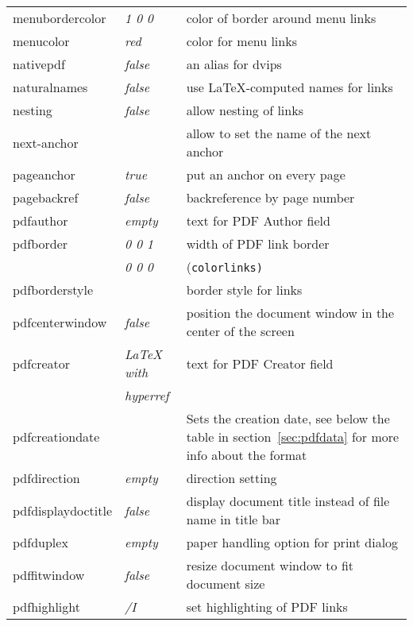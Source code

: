 \documentclass{article}
\begin{document}
\begin{longtable}{@{}>{\ttfamily}llp{7cm}@{}}
menubordercolor    & \textit{1 0 0}         & color of border around menu links \\
menucolor          & \textit{red}           & color for menu links \\
nativepdf          & \textit{false}         & an alias for \textsf{dvips} \\
naturalnames       & \textit{false}         & use \LaTeX-computed names for links \\
nesting            & \textit{false}         & allow nesting of links \\
next-anchor        &                        & allow to set the name of the next anchor\\
pageanchor         & \textit{true}          & put an anchor on every page \\
pagebackref        & \textit{false}         & backreference by page number \\
pdfauthor          & \textit{empty}         & text for PDF Author field \\
pdfborder          & \textit{0 0 1}         & width of PDF link border \\
                   & \textit{0 0 0}         & (\texttt{colorlinks)} \\
pdfborderstyle     &                        & border style for links \\
pdfcenterwindow    & \textit{false}         & position the document window in the center of the screen \\
pdfcreator         & \textit{LaTeX with}    & text for PDF Creator field \\
                   & \textit{hyperref}      & \\
pdfcreationdate    &                        & Sets the creation date, see below the table in section~\ref{sec:pdfdata} for more info about the format\\                    
pdfdirection       & \textit{empty}         & direction setting \\
pdfdisplaydoctitle & \textit{false}         & display document title instead
                                              of file name in title bar\\
pdfduplex          & \textit{empty}         & paper handling option for
                                              print dialog\\
pdffitwindow       & \textit{false}         & resize document window to fit document size \\
pdfhighlight       & \textit{/I}            & set highlighting of PDF links \\

\end{longtable}
\end{document}

